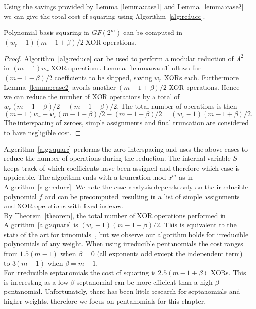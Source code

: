 \vspace{2mm}

Using the savings provided by Lemma~\ref{lemma:case1} and Lemma~\ref{lemma:case2} we can give the total cost of squaring using Algorithm~\ref{alg:reduce}.

\begin{thm} \label{theorem}
Polynomial basis squaring in $GF(2^m)$ can be computed in $(w_r-1) (m-1+\beta)/2$ XOR operations.
\end{thm}

\begin{proof}
    Algorithm~\ref{alg:reduce} can be used to perform a modular reduction of $A^2$ in $(m-1)w_r$ XOR operations. Lemma~\ref{lemma:case1} allows for $(m-1-\beta)/2$ coefficients to be skipped, saving $w_r$ XORs each. Furthermore Lemma~\ref{lemma:case2} avoids another $(m-1+\beta)/2$ XOR operations. Hence we can reduce the number of XOR operations by a total of $w_r (m-1-\beta)/2 + (m-1+\beta)/2$. The total number of operations is then $$(m-1)w_r - w_r (m-1-\beta)/2 - (m-1+\beta)/2 = (w_r-1) (m-1+\beta)/2.$$ The interspacing of zeroes, simple assignments and final truncation are considered to have negligible cost.
\end{proof}

Algorithm~\ref{alg:square} performs the zero interspacing and uses the above cases to reduce the number of operations during the reduction. The internal variable $S$ keeps track of which coefficients have been assigned and therefore which case is applicable. The algorithm ends with a truncation mod $x^m$ as in Algorithm~\ref{alg:reduce}. We note the case analysis depends only on the irreducible polynomial $f$ and can be precomputed, resulting in a list of simple assignments and XOR operations with fixed indexes. \\

By Theorem~\ref{theorem}, the total number of XOR operations performed in Algorithm~\ref{alg:square} is $(w_r-1) (m-1+\beta)/2$. This is equivalent to the state of the art for trinomials~\cite{wu2002bit}, but we observe our algorithm holds for irreducible polynomials of any weight. When using irreducible pentanomials the cost ranges from $1.5(m-1)$ when $\beta=0$ (all exponents odd except the independent term) to $3(m-1)$ when $\beta=m-1$. \\

For irreducible septanomials the cost of squaring is $2.5(m-1+\beta)$ XORs. This is interesting as a low $\beta$ septanomial can be more efficient than a high $\beta$ pentanomial. Unfortunately, there has been little research for septanomials and higher weights, therefore we focus on pentanomials for this chapter. \\

